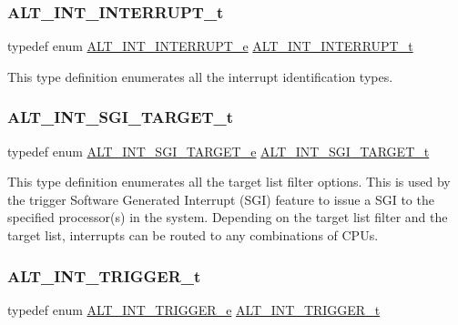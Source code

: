 \subsubsection{\texorpdfstring{ALT\_INT\_INTERRUPT\_t}{ALT\_INT\_INTERRUPT\_t}}
{\footnotesize\ttfamily typedef enum \mbox{\hyperlink{group__INT__COMMON_gaf87a5a7f416fc6f679b59dadacbeb592}{A\+L\+T\+\_\+\+I\+N\+T\+\_\+\+I\+N\+T\+E\+R\+R\+U\+P\+T\+\_\+e}}  \mbox{\hyperlink{group__INT__COMMON_ga394d3efae4a3ee1015ed47f9698deea6}{A\+L\+T\+\_\+\+I\+N\+T\+\_\+\+I\+N\+T\+E\+R\+R\+U\+P\+T\+\_\+t}}}

This type definition enumerates all the interrupt identification types. \mbox{\label{group__INT__COMMON_ga7e81bbf0aa421b2c5ec85a6bfe42c051}} 
\subsubsection{\texorpdfstring{ALT\_INT\_SGI\_TARGET\_t}{ALT\_INT\_SGI\_TARGET\_t}}
{\footnotesize\ttfamily typedef enum \mbox{\hyperlink{group__INT__COMMON_ga746ce27835235f2cd0199b089482b770}{A\+L\+T\+\_\+\+I\+N\+T\+\_\+\+S\+G\+I\+\_\+\+T\+A\+R\+G\+E\+T\+\_\+e}}
 \mbox{\hyperlink{group__INT__COMMON_ga7e81bbf0aa421b2c5ec85a6bfe42c051}{A\+L\+T\+\_\+\+I\+N\+T\+\_\+\+S\+G\+I\+\_\+\+T\+A\+R\+G\+E\+T\+\_\+t}}}

This type definition enumerates all the target list filter options. This is used by the trigger Software Generated Interrupt (S\+GI) feature to issue a S\+GI to the specified processor(s) in the system. Depending on the target list filter and the target list, interrupts can be routed to any combinations of C\+P\+Us. \mbox{\label{group__INT__COMMON_ga69d4792f881cdf473ca64f8b4e23ba52}} 
\subsubsection{\texorpdfstring{ALT\_INT\_TRIGGER\_t}{ALT\_INT\_TRIGGER\_t}}
{\footnotesize\ttfamily typedef enum \mbox{\hyperlink{group__INT__COMMON_ga30a2ad1b5e644feb2f502ab3fb39756e}{A\+L\+T\+\_\+\+I\+N\+T\+\_\+\+T\+R\+I\+G\+G\+E\+R\+\_\+e}}
 \mbox{\hyperlink{group__INT__COMMON_ga69d4792f881cdf473ca64f8b4e23ba52}{A\+L\+T\+\_\+\+I\+N\+T\+\_\+\+T\+R\+I\+G\+G\+E\+R\+\_\+t}}}

